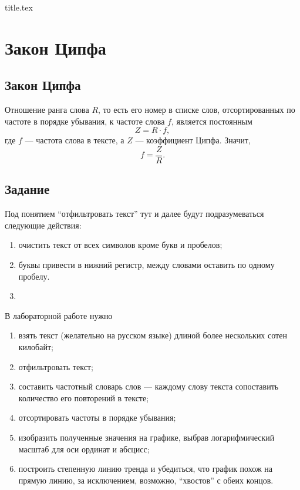 



{title.tex}

\clearpage
\setcounter{page}{2}

\tableofcontents
\thispagestyle{empty}

\clearpage
\pagestyle{fancy}

\clearpage

\chapter{Закон Ципфа}

\section{Закон Ципфа}
Отношение ранга слова $R$, то есть его номер в списке слов,
отсортированных по частоте в порядке убывания, к частоте слова $f$,
является постоянным
\begin{equation*}
  Z = R \cdot f,
\end{equation*}
где $f$ --- частота слова в тексте, а $Z$ --- коэффициент Ципфа.
Значит,
\begin{equation*}
  f = \frac{Z}{R}.
\end{equation*}

\section{Задание}

Под понятием ``отфильтровать текст'' тут и далее будут подразумеваться
следующие действия:
\begin{enumerate}
  \item
    очистить текст от всех символов кроме букв и пробелов;
  \item
    буквы привести в нижний регистр, между словами оставить по одному пробелу.
  \item
\end{enumerate}

В лабораторной работе нужно
\begin{enumerate}
  \item
    взять текст (желательно на русском языке)
    длиной более нескольких сотен килобайт;
  \item
    отфильтровать текст;
  \item
    составить частотный словарь слов --- каждому слову текста
    сопоставить количество его повторений в тексте;
  \item
    отсортировать частоты в порядке убывания;
  \item
    изобразить полученные значения на графике,
    выбрав логарифмический масштаб для оси ординат и абсцисс;
  \item
    построить степенную линию тренда и убедиться,
    что график похож на прямую линию, за исключением, возможно,
    ``хвостов'' с обеих концов.
\end{enumerate}

